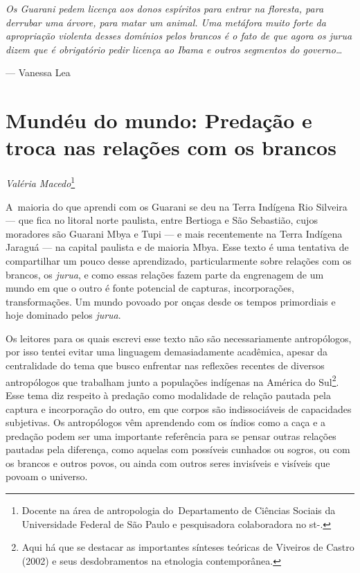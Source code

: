 \clearpage

\vspace*{\fill}

\begin{flushleft}
\begin{minipage}[c]{0.85\textwidth}
\raggedright
\footnotesize
\emph{Os Guarani pedem licença aos donos espíritos para entrar na floresta,
para derrubar uma árvore, para matar um animal. Uma metáfora muito
forte da apropriação violenta desses domínios pelos brancos é o fato de
que agora os jurua dizem que é obrigatório pedir licença ao Ibama e
outros segmentos do governo\ldots{}}

\smallskip
\hspace*{\fill}--- Vanessa Lea
\end{minipage}
\end{flushleft}

\chapter{Mundéu do mundo: Predação e troca nas relações com os brancos} 
\begin{flushright}
\emph{Valéria Macedo}\footnote{Docente na área de antropologia
do~Departamento de Ciências Sociais da Universidade Federal de São
Paulo e pesquisadora colaboradora no st-.}
\end{flushright}
\medskip

\noindent A~maioria do que aprendi com os Guarani se deu na Terra Indígena Rio
Silveira --- que fica no litoral norte paulista, entre Bertioga e São
Sebastião, cujos moradores são Guarani Mbya e Tupi --- e mais
recentemente na Terra Indígena Jaraguá --- na capital paulista e de
maioria Mbya. Esse texto é uma tentativa de compartilhar um pouco desse
aprendizado, particularmente sobre relações com os brancos, os \emph{jurua}, e
como essas relações fazem parte da engrenagem de um mundo em que o
outro é fonte potencial de capturas, incorporações, transformações. Um
mundo povoado por onças desde os tempos primordiais e hoje dominado
pelos \emph{jurua}. 

Os leitores para os quais escrevi esse texto não são necessariamente
antropólogos, por isso tentei evitar uma linguagem demasiadamente
acadêmica, apesar da centralidade do tema que busco enfrentar nas
reflexões recentes de diversos antropólogos que trabalham junto a
populações indígenas na América do Sul\footnote{Aqui há que se destacar
as importantes sínteses teóricas de Viveiros de Castro (2002) e seus
desdobramentos na etnologia contemporânea.}. Esse tema diz respeito à
predação como modalidade de relação pautada pela captura e incorporação
do outro, em que corpos são indissociáveis de capacidades subjetivas.
Os antropólogos vêm aprendendo com os índios como a caça e a predação
podem ser uma importante referência para se pensar outras relações
pautadas pela diferença, como aquelas com possíveis cunhados ou sogros,
ou com os brancos e outros povos, ou ainda com outros seres invisíveis
e visíveis que povoam o universo.

